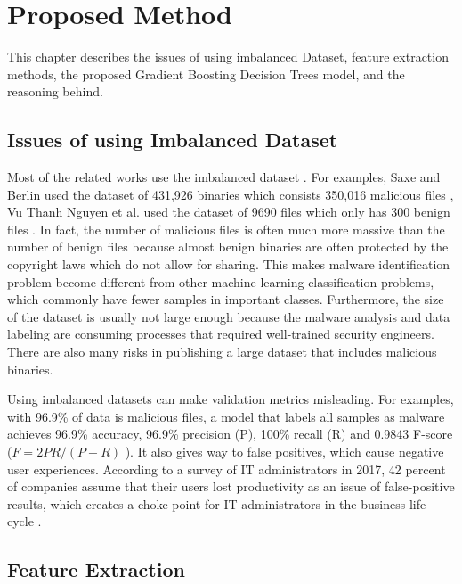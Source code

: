 \chapter{Proposed Method}
\graphicspath{{Chapter4/Figs/}}

\begin{chapabstract}
This chapter describes the issues of using imbalanced Dataset, feature extraction methods, the proposed Gradient Boosting Decision Trees model, and the reasoning behind.
\end{chapabstract}

\section{Issues of using Imbalanced Dataset}

Most of the related works use the imbalanced dataset \cite{saxe2015deep,vu2017metamorphic}. 
For examples, Saxe and Berlin used the dataset of 431,926 binaries which consists 350,016 malicious files \cite{saxe2015deep}, Vu Thanh Nguyen et al. used the dataset of 9690 files which only has 300 benign files \cite{vu2017metamorphic}. 
In fact, the number of malicious files is often much more massive than the number of benign files because almost benign binaries are often protected by the copyright laws which do not allow for sharing. 
This makes malware identification problem become different from other machine learning classification problems, which commonly have fewer samples in important classes. 
Furthermore, the size of the dataset is usually not large enough because the malware analysis and data labeling are consuming processes that required well-trained security engineers. 
There are also many risks in publishing a large dataset that includes malicious binaries. 

Using imbalanced datasets can make validation metrics misleading.
For examples, with 96.9\% of data is malicious files, a model that labels all samples as malware achieves 96.9\% accuracy, 96.9\% precision (P), 100\% recall (R) and 0.9843 F-score ($F =  2PR / (P + R) $ \cite{chinchor1992muc}).
It also gives way to false positives, which cause negative user experiences.
According to a survey of IT administrators in 2017, 42 percent of companies assume that their users lost productivity as an issue of false-positive results, which creates a choke point for IT administrators in the business life cycle \cite{jonathan2017survey}.


\section{Feature Extraction}
\label{sec:feature-extraction}

